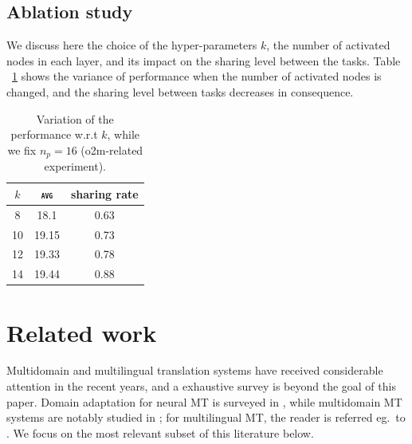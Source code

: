 \documentclass[11pt]{article}
\newcommand{\domain}[1]{\texttt{\textsc{#1}}}
\begin{document}
\subsection{Ablation study}
We discuss here the choice of the hyper-parameters $k$, the number of activated nodes in each layer, and its impact on the sharing level between the tasks. Table ~\ref{tab:K} shows the variance of performance when the number of activated nodes is changed, and the sharing level between tasks decreases in consequence.
\begin{table}[h!]
  \centering
  \begin{tabular}{|c|c|c|} \hline
    $k$ & \domain{avg} & sharing rate \\ \hline 
    8 & 18.1 & 0.63\\
    10 & 19.15 & 0.73\\
    12 & 19.33 & 0.78\\
    14 & 19.44 & 0.88\\
    \hline
  \end{tabular}
  \caption{Variation of the performance w.r.t $k$, while we fix $n_p=16$ (o2m-related experiment).}
  \label{tab:K}
\end{table}

\section{Related work}\label{sec:related}
Multidomain and multilingual translation systems have received considerable attention in the recent years, and a exhaustive survey is beyond the goal of this paper. Domain adaptation for neural MT is surveyed in \citep{Chu17comparison}, while multidomain MT systems are notably studied in \cite{Saunders21Asurvey,Pham21revisiting}; for multilingual MT, the reader is referred eg.\ to \citep{Chu18multilingual,dabre20survey}. We focus on the most relevant subset of this literature below.
\end{document}

